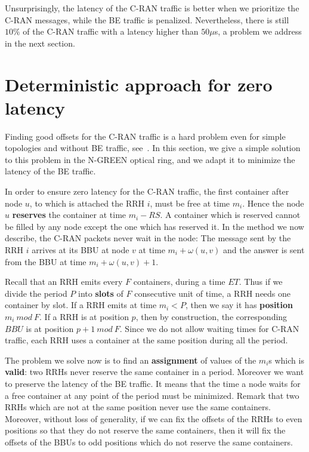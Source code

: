 \documentclass[]{llncs}
\begin{document}
Unsurprisingly, the latency of the C-RAN traffic is better when we prioritize the C-RAN messages, while the BE traffic is penalized. Nevertheless, there is still $10\%$ of the C-RAN traffic with a latency higher than $50 \mu$s, a problem we address in the next section.


\section{Deterministic approach for zero latency} \label{sec:deterministicalgorithms}

Finding good offsets for the C-RAN traffic is a hard problem even for simple topologies and without BE traffic, see~\cite{dominique2018deterministic}. In this section, we give a simple solution to this problem in the N-GREEN optical ring, and we adapt it to minimize the latency of the BE traffic.

In order to ensure zero latency for the C-RAN traffic, the first container after node $u$, to which is attached the RRH $i$, must be free at time $m_i$. Hence the node $u$ \textbf{reserves} the container at time $m_i - RS$. A container which is reserved cannot be filled by any node except the one which has reserved it. In the method we now describe, the C-RAN packets never wait in the node: The message sent by the RRH $i$ arrives at its BBU at node $v$ at time $m_i + \omega(u,v)$ and the answer is sent from the BBU at time $m_i + \omega(u,v) +1$.

Recall that an RRH emits every $F$ containers, during a time $ET$. 
Thus if we divide the period $P$ into \textbf{slots} of $F$ consecutive unit of time, a RRH needs one container by slot.
 If a RRH emits at time $m_i < P$, then we say it has \textbf{position} $m_i~mod~F$. If a RRH is at position $p$, then by construction, the corresponding $BBU$ is at position $p+1~mod~F$. Since we do not allow waiting times for C-RAN traffic, each RRH uses a container at the same position during all the period.

The problem we solve now is to find an \textbf{assignment} of values of the $m_i$s which is \textbf{valid}: two RRHs never reserve the same container in a period. Moreover we want to preserve the latency of the BE traffic. It means that the time a node waits for a free container at any point of the period must be minimized. 
Remark that two RRHs which are not at the same position never use the same containers. Moreover, without loss of generality, 
if we can fix the offsets of the RRHs to even positions so that they do not reserve the same containers, then it will fix the offsets of the BBUs to odd positions which do not reserve the same containers. 
\end{document}
